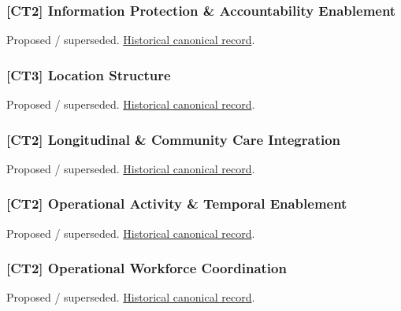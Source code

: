 \subsubsection{[CT2] Information Protection \& Accountability Enablement}

\par\label{element:e922cba7cf1d4ebeb9abf6472a3803ce}
Proposed / superseded. \href{../../../../continuum/strategy/capability/e922cba7cf1d4ebeb9abf6472a3803ce.md}{Historical canonical record}.\par

\subsubsection{[CT3] Location Structure}

\par\label{element:2436c87195334daf85ed4e2de4ec4bd5}
Proposed / superseded. \href{../../../../continuum/strategy/capability/2436c87195334daf85ed4e2de4ec4bd5.md}{Historical canonical record}.\par

\subsubsection{[CT2] Longitudinal \& Community Care Integration}

\par\label{element:8430d50adc504ecc959f15b7cbbcd095}
Proposed / superseded. \href{../../../../continuum/strategy/capability/8430d50adc504ecc959f15b7cbbcd095.md}{Historical canonical record}.\par

\subsubsection{[CT2] Operational Activity \& Temporal Enablement}

\par\label{element:ca96b2b2ff434854995711e403e95f6f}
Proposed / superseded. \href{../../../../continuum/strategy/capability/ca96b2b2ff434854995711e403e95f6f.md}{Historical canonical record}.\par

\subsubsection{[CT2] Operational Workforce Coordination}

\par\label{element:66e72222f2064a23adbdb0311092918b}
Proposed / superseded. \href{../../../../continuum/strategy/capability/66e72222f2064a23adbdb0311092918b.md}{Historical canonical record}.\par

